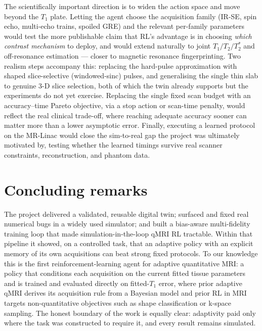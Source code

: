 The scientifically important direction is to widen the action space and move
beyond the $T_1$ plate. Letting the agent choose the acquisition family
(IR-SE, spin echo, multi-echo trains, spoiled GRE) and the relevant per-family
parameters would test the more publishable claim that RL's advantage is in
choosing \emph{which contrast mechanism} to deploy, and would extend naturally
to joint $T_1/T_2/T_2^*$ and off-resonance estimation --- closer to magnetic
resonance fingerprinting. Two realism steps accompany this: replacing the
hard-pulse approximation with shaped slice-selective (windowed-sinc) pulses,
and generalising the single thin slab to genuine 3-D slice selection, both of
which the twin already supports but the experiments do not yet exercise.
Replacing the single fixed scan budget with an accuracy--time Pareto objective,
via a stop action or scan-time penalty, would reflect the real clinical
trade-off, where reaching adequate accuracy sooner can matter more than a lower
asymptotic error. Finally, executing a learned protocol on the MR-Linac would
close the sim-to-real gap the project was ultimately motivated by, testing
whether the learned timings survive real scanner constraints, reconstruction,
and phantom data.

\section{Concluding remarks}
\label{sec:concl-closing}

The project delivered a validated, reusable digital twin; surfaced and fixed
real numerical bugs in a widely used simulator; and built a bias-aware
multi-fidelity training loop that made simulation-in-the-loop qMRI RL
tractable. Within that pipeline it showed, on a controlled task, that an
adaptive policy with an explicit memory of its own acquisitions can beat
strong fixed protocols. To our knowledge this is the first reinforcement-learning
agent for adaptive quantitative MRI: a policy that conditions each acquisition
on the current fitted tissue parameters and is trained and evaluated directly
on fitted-$T_1$ error, where prior adaptive qMRI derives its acquisition rule
from a Bayesian model and prior RL in MRI targets non-quantitative objectives
such as shape classification or k-space sampling. The honest boundary of the
work is equally clear: adaptivity paid only where the task was constructed to
require it, and every result remains simulated.

